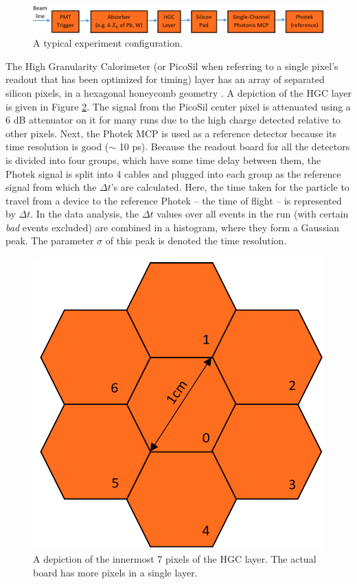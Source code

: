 \documentclass[12pt]{article}
\begin{document}
\begin{figure}
\centering
\includegraphics[width=\linewidth]{setup.png}
\caption{A typical experiment configuration.}
\label{fig:setup}
\end{figure}

The High Granularity Calorimeter (or PicoSil when referring to a single pixel’s readout that has been optimized for timing) layer has an array of separated silicon pixels, in a hexagonal honeycomb geometry \cite{P2}. A depiction of the HGC layer is given in Figure \ref{fig:HGC}. The signal from the PicoSil center pixel is attenuated using a 6 dB attenuator on it for many runs due to the high charge detected relative to other pixels. Next, the Photek MCP is used as a reference detector because its time resolution is good ($\sim$ 10 ps). Because the readout board for all the detectors is divided into four groups, which have some time delay between them, the Photek signal is split into 4 cables and plugged into each group as the reference signal from which the $\Delta t$’s are calculated. Here, the time taken for the particle to travel from a device to the reference Photek – the time of flight – is represented by $\Delta t$. In the data analysis, the $\Delta t$ values over all events in the run (with certain \textit{bad} events excluded) are combined in a histogram, where they form a Gaussian peak. The parameter $\sigma$ of this peak is denoted the time resolution.

\begin{figure}
\centering
\begin{minipage}{.5\textwidth}
\centering
\includegraphics[scale=0.5]{HGC.png}
\caption{A depiction of the innermost 7 pixels of the HGC layer. The actual board has more pixels in a single layer.}
\label{fig:HGC}
\end{minipage}
\end{figure}
\end{document}
